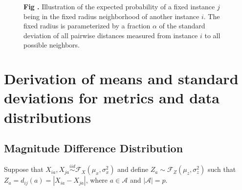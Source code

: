\documentclass[10pt,letterpaper]{article}\usepackage[]{graphicx}\usepackage[]{color}
\begin{document}
\begin{figure}[ht!]
\centering
\begin{minipage}[h]{0.7\textwidth}
\end{minipage}%
\begin{minipage}[h]{0.3\textwidth}
\noindent{}\textbf{Fig \thefigure \label{fig:gaussPlot}.} Illustration of the expected probability of a fixed instance $j$ being in the fixed radius neighborhood of another instance $i$. The fixed radius is parameterized by a fraction $\alpha$ of the standard deviation of all pairwise distances measured from instance $i$ to all possible neighbors.
\end{minipage}
\end{figure} 

\section{Derivation of means and standard deviations for metrics and data distributions}

\subsection{Magnitude Difference Distribution}

Suppose that $X_{ia}, X_{ja} \overset{iid}{\sim} \mathcal{F}_X(\mu_x,\sigma^2_x)$ and define $Z_a \sim \mathcal{F}_Z(\mu_z,\sigma^2_z)$ such that $Z_a = d_{ij}(a) = |X_{ia} - X_{ja}|$, where $a \in \mathcal{A}$ and $|\mathcal{A}| = p$.
\end{document}
